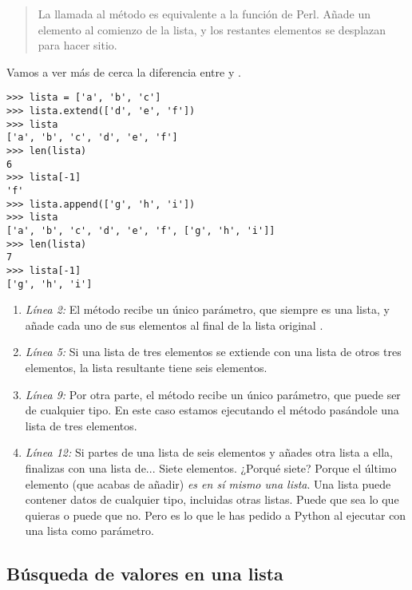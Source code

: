 \begin{quote}
La llamada al método  es equivalente a la función  de Perl. Añade un elemento al comienzo de la lista, y los restantes elementos se desplazan para hacer sitio.
\end{quote}

Vamos a ver más de cerca la diferencia entre  y .

\noindent\begin{minipage}{\textwidth}
\begin{lstlisting}[mathescape=True]
>>> lista = ['a', 'b', 'c']
>>> lista.extend(['d', 'e', 'f'])
>>> lista
['a', 'b', 'c', 'd', 'e', 'f']
>>> len(lista)
6
>>> lista[-1]
'f'
>>> lista.append(['g', 'h', 'i'])
>>> lista
['a', 'b', 'c', 'd', 'e', 'f', ['g', 'h', 'i']]
>>> len(lista)
7
>>> lista[-1]
['g', 'h', 'i']
\end{lstlisting}
\end{minipage}

\begin{enumerate}

\item \emph{Línea 2:} El método  recibe un único parámetro, que siempre es una lista, y añade cada uno de sus elementos al final de la lista original .

\item \emph{Línea 5:} Si una lista de tres elementos se extiende con una lista de otros tres elementos, la lista resultante tiene seis elementos.

\item \emph{Línea 9:} Por otra parte, el método  recibe un único parámetro, que puede ser de cualquier tipo. En este caso estamos ejecutando el método pasándole una lista de tres elementos.

\item \emph{Línea 12:} Si partes de una lista de seis elementos y añades otra lista a ella, finalizas con una lista de... Siete elementos. ¿Porqué siete? Porque el último elemento (que acabas de añadir) \emph{es en sí mismo una lista}. Una lista puede contener datos de cualquier tipo, incluidas otras listas. Puede que sea lo que quieras o puede que no. Pero es lo que le has pedido a Python al ejecutar  con una lista como parámetro. 

\end{enumerate}

\subsection{Búsqueda de valores en una lista}

